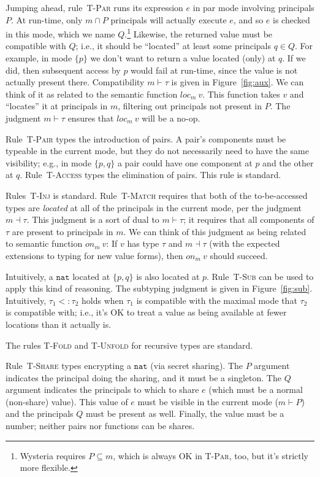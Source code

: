 \documentclass[10pt]{article}
\newcommand{\rulelab}[1]{{\small \textsc{#1}}}
\newcommand{\tnat}{\ensuremath{\mathtt{nat}}}
\newcommand{\subtype}{\ensuremath{<:}}
\newcommand{\issub}[2]{{#1} \subtype {#2}}
\newcommand{\locof}[2]{\ensuremath{\mathit{loc}_{#1}~{#2}}}
\newcommand{\getat}[2]{\ensuremath{\mathit{on}_{#1}~{#2}}}
\begin{document}
Jumping ahead, rule~\rulelab{T-Par} runs its expression $e$ in par
mode involving principals $P$. At run-time, only $m \cap P$ principals
will actually execute $e$, and so $e$ is checked in this mode, which
we name $Q$.\footnote{Wysteria requires $P \subseteq m$, which is
  always OK in \rulelab{T-Par}, too, but it's strictly more flexible.}
Likewise, the returned value must be compatible with $Q$;
i.e., it should be ``located'' at least some principals $q \in Q$.
For example, in mode $\{p\}$ we don't want to return a value located
(only) at $q$. If we did, then subsequent access by $p$ would fail at
run-time, since the value is not actually present there.
%
Compatibility $m \vdash \tau$ is given in Figure~\ref{fig:aux}. We can
think of it as related to the semantic function $\locof{m}{v}$. This
function takes $v$ and ``locates'' it at principals in $m$, filtering
out principals not present in $P$. The judgment $m \vdash \tau$
ensures that $\locof{m}{v}$ will be a no-op.

Rule~\rulelab{T-Pair} types the introduction of pairs. A pair's
components must be typeable in the current mode, but they do not
necessarily need to have the same visibility; e.g., in mode $\{p,q\}$
a pair could have one component at $p$ and the other at
$q$. Rule~\rulelab{T-Access} types the elimination of pairs. This rule
is standard.

Rules~\rulelab{T-Inj} is standard. Rule~\rulelab{T-Match} requires
that both of the to-be-accessed types are \emph{located} at all of the
principals in the current mode, per the judgment $m \dashv \tau$. This
judgment is a sort of dual to $m \vdash \tau$; it requires that all
components of $\tau$ are present to principals in $m$. We can think of
this judgment as being related to semantic function $\getat{m}{v}$: If $v$
has type $\tau$ and $m \dashv \tau$ (with the expected extensions to
typing for new value forms), then $\getat{m}{v}$ should succeed.

Intuitively, a $\tnat$ located at $\{p,q\}$ is also located at
$p$. Rule~\rulelab{T-Sub} can be used to apply this kind of
reasoning. The subtyping judgment is given in
Figure~\ref{fig:sub}. Intuitively, $\issub{\tau_1}{\tau_2}$ holds when
$\tau_1$ is compatible with the maximal mode that $\tau_2$ is
compatible with; i.e., it's OK to treat a value as being available at
fewer locations than it actually is.

The rules \rulelab{T-Fold} and \rulelab{T-Unfold} for recursive types
are standard.

Rule~\rulelab{T-Share} types encrypting a $\tnat$ (via secret
sharing). The $P$ argument indicates the principal doing the sharing,
and it must be a singleton. The $Q$ argument indicates the principals
to which to share $e$ (which must be a normal (non-share) value). This
value of $e$ must be visible in the current mode ($m \vdash P$) and
the principals $Q$ must be present as well. Finally, the value must be
a number; neither pairs nor functions can be shares.
\end{document}
